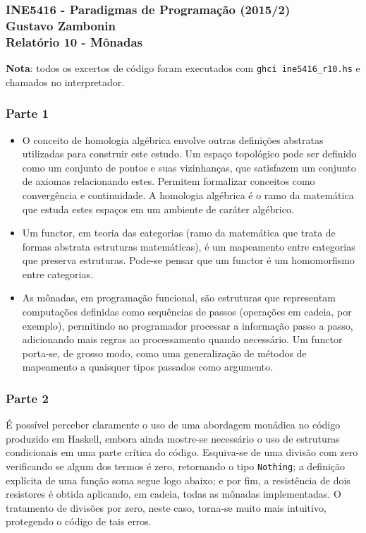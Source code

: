 \documentclass{article}
\begin{document}
\subsubsection*{INE5416 - Paradigmas de Programação (2015/2) \\
    Gustavo Zambonin \\
    Relatório 10 - Mônadas
}

\textbf{Nota}: todos os excertos de código foram executados com
\texttt{ghci ine5416\_r10.hs} e chamados no interpretador.

\subsubsection*{Parte 1}
\begin{itemize}
    \item O conceito de homologia algébrica envolve outras definições abstratas
    utilizadas para construir este estudo. Um espaço topológico pode ser
    definido como um conjunto de pontos e suas vizinhanças, que satisfazem um
    conjunto de axiomas relacionando estes. Permitem formalizar conceitos como
    convergência e continuidade. A homologia algébrica é o ramo da matemática
    que estuda estes espaços em um ambiente de caráter algébrico.

    \item Um functor, em teoria das categorias (ramo da matemática que trata
    de formas abstrata estruturas matemáticas), é um mapeamento entre
    categorias que preserva estruturas. Pode-se pensar que um functor é um
    homomorfismo entre categorias.

    \item As mônadas, em programação funcional, são estruturas que representam
    computações definidas como sequências de passos (operações em cadeia, por
    exemplo), permitindo ao programador processar a informação passo a passo,
    adicionando mais regras ao processamento quando necessário. Um functor
    porta-se, de grosso modo, como uma generalização de métodos de mapeamento
    a quaisquer tipos passados como argumento.
\end{itemize}

\subsubsection*{Parte 2}

É possível perceber claramente o uso de uma abordagem monádica no código
produzido em Haskell, embora ainda mostre-se necessário o uso de estruturas
condicionais em uma parte crítica do código. Esquiva-se de uma divisão com zero
verificando se algum dos termos é zero, retornando o tipo \texttt{Nothing}; a
definição explícita de uma função soma segue logo abaixo; e por fim, a
resistência de dois resistores é obtida aplicando, em cadeia, todas as mônadas
implementadas. O tratamento de divisões por zero, neste caso, torna-se muito
mais intuitivo, protegendo o código de tais erros.
\end{document}
